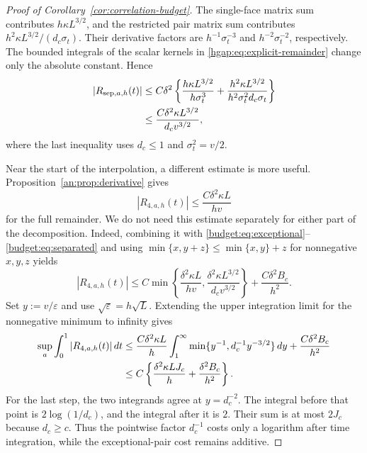 \documentclass[11pt,letterpaper]{article}
\theoremstyle{remark}
\begin{document}
\begin{proof}[Proof of Corollary~\ref{cor:correlation-budget}]
The single-face matrix sum contributes $h\kappa L^{3/2}$, and
the restricted pair matrix sum contributes
$h^2\kappa L^{3/2}/(d_c\sigma_t)$. Their derivative factors are
$h^{-1}\sigma_t^{-3}$ and $h^{-2}\sigma_t^{-2}$, respectively.
The bounded integrals of the scalar kernels in
\eqref{hgap:eq:explicit-remainder} change only the absolute
constant. Hence
\begin{align}
 |R_{\mathrm{sep},a,h}(t)|
 &\le C\delta^2\left\{
    \frac{h\kappa L^{3/2}}{h\sigma_t^3}
   +\frac{h^2\kappa L^{3/2}}{h^2\sigma_t^2d_c\sigma_t}
                    \right\}\notag\\
 &\le\frac{C\delta^2\kappa L^{3/2}}{d_cv^{3/2}},
 \label{budget:eq:separated}
\end{align}
where the last inequality uses $d_c\le1$ and $\sigma_t^2=v/2$.

Near the start of the interpolation, a different estimate is
more useful. Proposition~\ref{an:prop:derivative} gives
\[
 |R_{4,a,h}(t)|\le\frac{C\delta^2\kappa L}{hv}
\]
for the full remainder. We do not need this estimate separately
for either part of the decomposition. Indeed, combining it with
\eqref{budget:eq:exceptional}--\eqref{budget:eq:separated} and using
$\min\{x,y+z\}\le\min\{x,y\}+z$ for nonnegative $x,y,z$ yields
\[
 |R_{4,a,h}(t)|\le
 C\min\left\{\frac{\delta^2\kappa L}{hv},
              \frac{\delta^2\kappa L^{3/2}}{d_cv^{3/2}}\right\}
 +\frac{C\delta^2B_c}{h^2}.
\]
Set $y:=v/\varepsilon$ and use $\sqrt\varepsilon=h\sqrt L$.
Extending the upper integration limit for the nonnegative minimum
to infinity gives
\begin{align}
 \sup_a\int_0^1|R_{4,a,h}(t)|\,dt
 &\le\frac{C\delta^2\kappa L}{h}
   \int_1^\infty\min\{y^{-1},d_c^{-1}y^{-3/2}\}\,dy
   +\frac{C\delta^2B_c}{h^2}\notag\\
 &\le C\left\{\frac{\delta^2\kappa LJ_c}{h}
                  +\frac{\delta^2B_c}{h^2}\right\}.
 \label{budget:eq:integrated}
\end{align}
For the last step, the two integrands agree at $y=d_c^{-2}$.
The integral before that point is $2\log(1/d_c)$, and the integral
after it is $2$. Their sum is at most $2J_c$ because $d_c\ge c$.
Thus the pointwise factor $d_c^{-1}$ costs only a logarithm after
time integration, while the exceptional-pair cost remains additive.


\end{proof}
\end{document}
